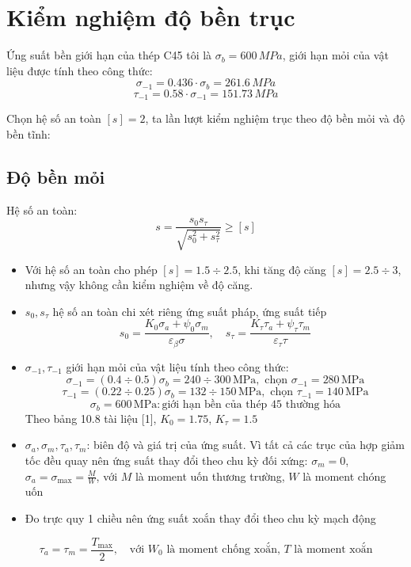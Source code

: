
\section{Kiểm nghiệm độ bền trục}
\noindent Ứng suất bền giới hạn của thép C45 tôi là $\sigma_b = 600 \, MPa$, giới hạn mỏi của vật liệu được tính theo công thức:
$$ \sigma_{-1} = 0.436 \cdot \sigma_b = 261.6 \, MPa $$
$$ \tau_{-1} = 0.58 \cdot \sigma_{-1} = 151.73 \, MPa $$

\noindent Chọn hệ số an toàn $[s] = 2$, ta lần lượt kiểm nghiệm trục theo độ bền mỏi và độ bền tĩnh:

\subsection{Độ bền mỏi}
Hệ số an toàn:
\[
s = \frac{s_0 s_\tau}{\sqrt{s_0^2 + s_\tau^2}} \geq [s]
\]
\begin{itemize}
    \item Với hệ số an toàn cho phép $[s] = 1.5 \div 2.5$, khi tăng độ căng $[s] = 2.5 \div 3$, nhưng vậy không cần kiểm nghiệm về độ căng.
    \item $s_0, s_\tau$ hệ số an toàn chi xét riêng ứng suất pháp, ứng suất tiếp
    \[
    s_0 = \frac{K_0 \sigma_a + \psi_0 \sigma_m}{\varepsilon_\beta \sigma}, \quad s_\tau = \frac{K_\tau \tau_a + \psi_\tau \tau_m}{\varepsilon_\tau \tau}
    \]
    \item $\sigma_{-1}, \tau_{-1}$ giới hạn mỏi của vật liệu tính theo công thức:
    \[
    \sigma_{-1} = (0.4 \div 0.5) \sigma_b = 240 \div 300 \, \text{MPa}, \text{ chọn } \sigma_{-1} = 280 \, \text{MPa}
    \]
    \[
    \tau_{-1} = (0.22 \div 0.25) \sigma_b = 132 \div 150 \, \text{MPa}, \text{ chọn } \tau_{-1} = 140 \, \text{MPa}
    \]
    \[
    \sigma_b = 600 \, \text{MPa}: \text{giới hạn bền của thép 45 thường hóa}
    \]
    Theo bảng 10.8 tài liệu [1], $K_0 = 1.75$, $K_\tau = 1.5$
    \item $\sigma_a, \sigma_m, \tau_a, \tau_m$: biên độ và giá trị của ứng suất. Vì tất cả các trục của hợp giảm tốc đều quay nên ứng suất thay đổi theo chu kỳ đối xứng: $\sigma_m = 0$, $\sigma_a = \sigma_{\text{max}} = \frac{M}{W}$, với $M$ là moment uốn thương trường, $W$ là moment chóng uốn
    \item Đo trực quy 1 chiều nên ứng suất xoắn thay đổi theo chu kỳ mạch động
\end{itemize}
\[
\tau_a = \tau_m = \frac{T_{\text{max}}}{2}, \quad \text{với } W_0 \text{ là moment chống xoắn, } T \text{ là moment xoắn}
\]
